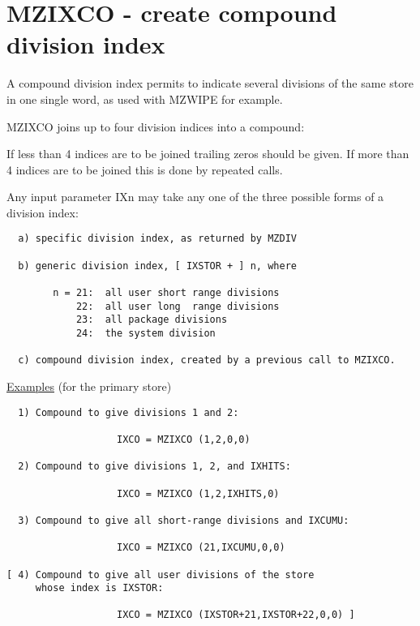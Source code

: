 \section{MZIXCO - create compound division index}

A compound division index permits to indicate several divisions
of the same store in one single word,
as used with MZWIPE for example.

MZIXCO joins up to four division indices into a compound:


If less than 4 indices are to be joined trailing zeros
should be given.
If more than 4 indices are to be joined this is done by
repeated calls.

Any input parameter IXn may take any one of the three possible
forms of a division index:
\begin{verbatim}
  a) specific division index, as returned by MZDIV

  b) generic division index, [ IXSTOR + ] n, where

        n = 21:  all user short range divisions
            22:  all user long  range divisions
            23:  all package divisions
            24:  the system division

  c) compound division index, created by a previous call to MZIXCO.

\end{verbatim} 
\ul{Examples} \hspace*{2mm}  (for the primary store)
\begin{verbatim}
  1) Compound to give divisions 1 and 2:

                   IXCO = MZIXCO (1,2,0,0)

  2) Compound to give divisions 1, 2, and IXHITS:

                   IXCO = MZIXCO (1,2,IXHITS,0)

  3) Compound to give all short-range divisions and IXCUMU:

                   IXCO = MZIXCO (21,IXCUMU,0,0)

[ 4) Compound to give all user divisions of the store
     whose index is IXSTOR:

                   IXCO = MZIXCO (IXSTOR+21,IXSTOR+22,0,0) ]
\end{verbatim} 

